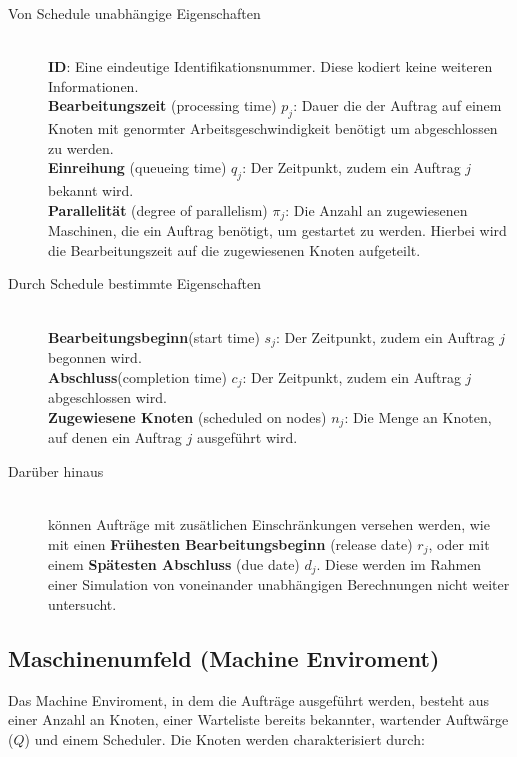 \begin{description}
\item[Von Schedule unabhängige Eigenschaften] \hfil \\
\textbf{ID}: Eine eindeutige Identifikationsnummer. Diese kodiert keine weiteren Informationen.\\
\textbf{Bearbeitungszeit} (processing time) $p_j$: Dauer die der Auftrag auf einem Knoten mit genormter Arbeitsgeschwindigkeit benötigt um abgeschlossen zu werden.\\
\textbf{Einreihung} (queueing time) $q_j$: Der Zeitpunkt, zudem ein Auftrag $j$ bekannt wird.\\
\textbf{Parallelität} (degree of parallelism) $\pi_j$: Die Anzahl an zugewiesenen Maschinen, die ein Auftrag benötigt, um gestartet zu werden. Hierbei wird die Bearbeitungszeit auf die zugewiesenen Knoten aufgeteilt.\\
\item[Durch Schedule bestimmte Eigenschaften]\hfill \\ 
\textbf{Bearbeitungsbeginn}(start time) $s_j$: Der Zeitpunkt, zudem ein Auftrag $j$ begonnen wird. \\
\textbf{Abschluss}(completion time) $c_j$: Der Zeitpunkt, zudem ein Auftrag $j$ abgeschlossen wird.\\
\textbf{Zugewiesene Knoten} (scheduled on nodes) $n_j$: Die Menge an Knoten, auf denen ein Auftrag $j$ ausgeführt wird.\\

\item[Darüber hinaus] \hfil \\
können Aufträge mit zusätlichen Einschränkungen versehen werden, wie mit einen \textbf{Frühesten Bearbeitungsbeginn} (release date) $r_j$, oder mit einem \textbf{Spätesten Abschluss} (due date) $d_j$. Diese werden im Rahmen einer Simulation von voneinander unabhängigen Berechnungen nicht weiter untersucht.
\end{description}

\subsection{Maschinenumfeld (Machine Enviroment)}
Das Machine Enviroment, in dem die Aufträge ausgeführt werden, besteht aus einer Anzahl an Knoten, einer Warteliste bereits bekannter, wartender Auftwärge ($Q$) und einem Scheduler. Die Knoten werden charakterisiert durch:

